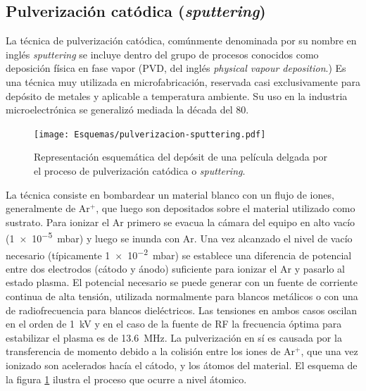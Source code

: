 	\subsection{Pulverización catódica (\textit{sputtering})}
				
		La técnica de pulverización catódica, comúnmente denominada por su nombre en inglés \textit{sputtering} se incluye dentro del grupo de procesos conocidos como deposición física en fase vapor (PVD, del inglés \textit{physical vapour deposition}.) Es una técnica muy utilizada en microfabricación, reservada casi exclusivamente para depósito de metales y aplicable a temperatura ambiente. Su uso en la industria microelectrónica se generalizó mediada la década del 80.\cite{Depla2010,Kelly2000}

			\begin{figure}[b!]
 				\begin{center}
 				\texttt{[image: Esquemas/pulverizacion-sputtering.pdf]}
 				\caption[Etapas del proceso de pulverización catódica]{Representación esquemática del depósit de una película delgada por el proceso de pulverización catódica o \textit{sputtering}.}
 		   		\label{fig:sssspputt}
 		    	\end{center}
 		    	\end{figure}

		La técnica consiste en bombardear un material blanco con un flujo de iones, generalmente de Ar$^+$, que luego son depositados sobre el material utilizado como sustrato. Para ionizar el Ar primero se evacua la cámara del equipo en alto vacío (\SI{1e-5}{\milli\bar}) y luego se inunda con Ar. Una vez alcanzado el nivel de vacío necesario (típicamente \SI{1e-2}{\milli\bar}) se establece una diferencia de potencial entre dos electrodos (cátodo y ánodo) suficiente para ionizar el Ar y pasarlo al estado plasma. El potencial necesario se puede generar con un fuente de corriente continua de alta tensión, utilizada normalmente para blancos metálicos o con una de radiofrecuencia para blancos dieléctricos. Las tensiones en ambos casos oscilan en el orden de \SI{1}{\kilo\volt} y en el caso de la fuente de RF la frecuencia óptima para estabilizar el plasma es de \SI{13.6}{\mega\hertz}. La pulverización en sí es causada por la transferencia de momento debido a la colisión entre los iones de Ar$^+$, que una vez ionizado son acelerados hacía el cátodo, y los átomos del material. El esquema de la figura \ref{fig:sssspputt} ilustra el proceso que ocurre a nivel átomico. \cite{Behrisch1981,sigmund1968,Bhatt2007}

